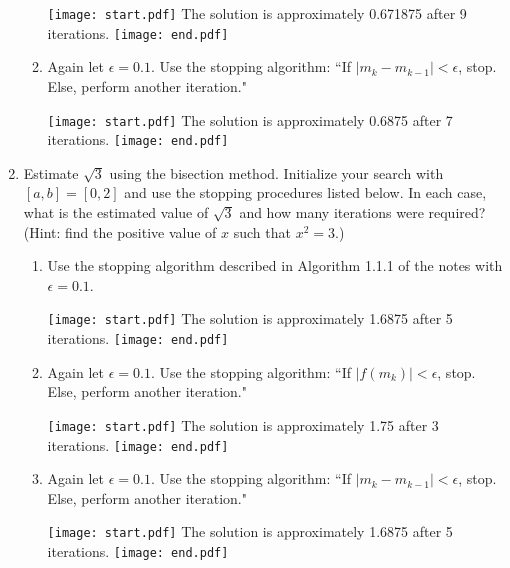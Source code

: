 \documentclass[12pt]{article}
\begin{document}
\begin{enumerate}
\begin{enumerate}
\texttt{[image: start.pdf]}
{The solution is approximately 0.671875 after 9 iterations.}
\texttt{[image: end.pdf]}


\item Again let $\epsilon=0.1$.  Use the stopping algorithm: ``If $|m_k-m_{k-1}|<\epsilon$, stop.  Else, perform another iteration."

\texttt{[image: start.pdf]}
{The solution is approximately 0.6875 after 7 iterations.}
\texttt{[image: end.pdf]}


\end{enumerate}

\item Estimate $\sqrt{3}$ using the bisection method.  Initialize your search with $[a,b]=[0,2]$ and use the stopping procedures listed below.  In each case, what is the estimated value of $\sqrt{3}$ and how many iterations were required?  (Hint: find the positive value of $x$ such that $x^2=3$.)

\begin{enumerate}

\item Use the stopping algorithm described in Algorithm 1.1.1 of the notes with $\epsilon=0.1$.

\texttt{[image: start.pdf]}
{The solution is approximately 1.6875 after 5 iterations.}
\texttt{[image: end.pdf]}


\item Again let $\epsilon=0.1$.  Use the stopping algorithm: ``If $|f(m_k)|<\epsilon$, stop.  Else, perform another iteration."

\texttt{[image: start.pdf]}
{The solution is approximately 1.75 after 3 iterations.}
\texttt{[image: end.pdf]}


\item Again let $\epsilon=0.1$.  Use the stopping algorithm: ``If $|m_k-m_{k-1}|<\epsilon$, stop.  Else, perform another iteration."

\texttt{[image: start.pdf]}
{The solution is approximately 1.6875 after 5 iterations.}
\texttt{[image: end.pdf]}


\end{enumerate}


\end{enumerate}
\end{document}
